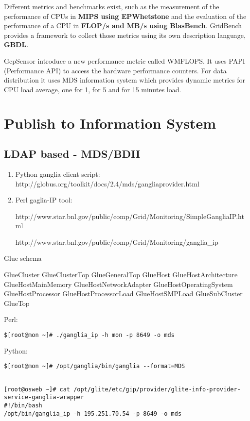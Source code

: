 Different metrics and benchmarks exist, such as the measurement of
the performance of CPUs in {\bf MIPS using EPWhetstone} and the evaluation of
the performance of a CPU in {\bf FLOP/s and MB/s using BlasBench}. GridBench
\cite{gridbench} provides a framework to collect those metrics using its own
description language, {\bf GBDL}.

GcpSensor \cite{gcpsensor} introduce a new performance metric called WMFLOPS. It
uses PAPI \cite{papi} (Performance API) to access the hardware performance
counters. For data distribution it uses MDS information system which provides
dynamic metrics for CPU load average, one for 1, for 5 and for 15 minutes load.
\newpage

\section{Publish to Information System}

\subsection{LDAP based - MDS/BDII}
\begin{enumerate}
  \item Python ganglia client script:
  http://globus.org/toolkit/docs/2.4/mds/gangliaprovider.html
  \item Perl gaglia-IP tool:
  
  http://www.star.bnl.gov/public/comp/Grid/Monitoring/SimpleGangliaIP.html
  
  http://www.star.bnl.gov/public/comp/Grid/Monitoring/ganglia\_ip

\end{enumerate}

\newpage
Glue schema

GlueCluster
GlueClusterTop
GlueGeneralTop
GlueHost
GlueHostArchitecture
GlueHostMainMemory
GlueHostNetworkAdapter
GlueHostOperatingSystem
GlueHostProcessor
GlueHostProcessorLoad
GlueHostSMPLoad
GlueSubCluster
GlueTop

Perl:
\begin{lstlisting}
$[root@mon ~]# ./ganglia_ip -h mon -p 8649 -o mds
\end{lstlisting}

Python:
\begin{lstlisting}
$[root@mon ~]# /opt/ganglia/bin/ganglia --format=MDS
\end{lstlisting}

\begin{lstlisting}

[root@osweb ~]# cat /opt/glite/etc/gip/provider/glite-info-provider-service-ganglia-wrapper
#!/bin/bash
/opt/bin/ganglia_ip -h 195.251.70.54 -p 8649 -o mds
\end{lstlisting}

